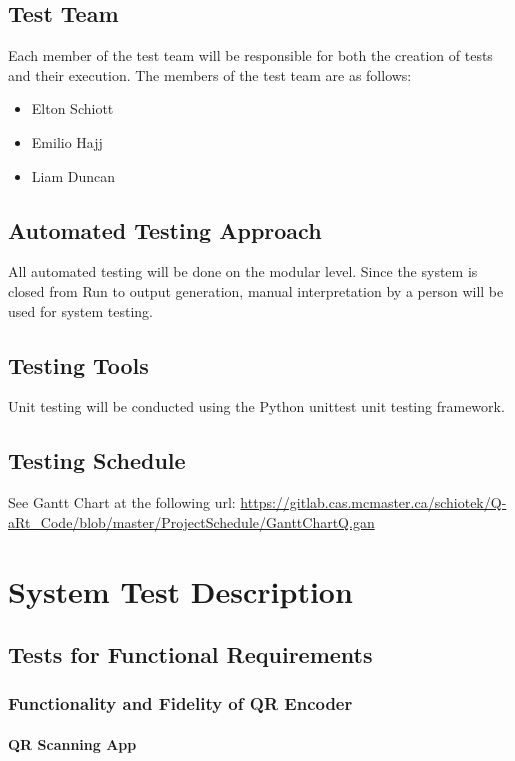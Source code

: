 \documentclass[12pt, titlepage]{article}
\begin{document}
\subsection{Test Team}
	Each member of the test team will be responsible for both the creation of 
	tests and their execution. The members of the test team are as follows:
	\begin{itemize}
		\item Elton Schiott
		\item Emilio Hajj
		\item Liam Duncan
	\end{itemize}
\subsection{Automated Testing Approach}
	All automated testing will be done on the modular level. 
    Since the system is closed from Run to output generation, manual interpretation by a person will be used for system testing.

\subsection{Testing Tools}
	Unit testing will be conducted using the Python unittest unit testing framework.
\subsection{Testing Schedule}
		
See Gantt Chart at the following url:
\url{https://gitlab.cas.mcmaster.ca/schiotek/Q-aRt_Code/blob/master/ProjectSchedule/GanttChartQ.gan}

\section{System Test Description}
	
\subsection{Tests for Functional Requirements}

\subsubsection{Functionality and Fidelity of QR Encoder}
		
\paragraph{QR Scanning App}
\end{document}

